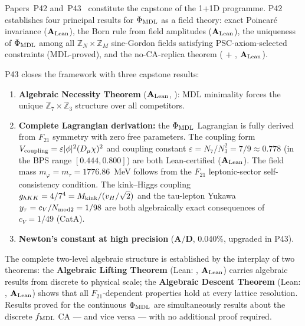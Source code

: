 Papers~P42 and~P43~\cite{SpivackPhiMDLField,SpivackCompleteness} constitute the
capstone of the 1+1D programme.  P42 establishes four principal results for
$\Phi_{\rm MDL}$ as a field theory: exact Poincar\'{e} invariance
($\mathbf{A}_{\rm Lean}$), the Born rule from field amplitudes
(\hspace{0pt}$\mathbf{A}_{\rm Lean}$), the uniqueness of $\Phi_{\rm MDL}$ among all
$\mathbb{Z}_N \times \mathbb{Z}_M$ sine-Gordon fields satisfying PSC-axiom-selected
constraints (MDL-proved), and the no-CA-replica theorem
( + ,
$\mathbf{A}_{\rm Lean}$).

P43 closes the framework with three capstone results:

\begin{enumerate}[leftmargin=2em,itemsep=0.2em]
  \item \textbf{Algebraic Necessity Theorem} ($\mathbf{A}_{\rm Lean}$,
    ): MDL minimality forces the unique
    $\mathbb{Z}_7 \times \mathbb{Z}_3$ structure over all competitors.
  \item \textbf{Complete Lagrangian derivation:} the $\Phi_{\rm MDL}$ Lagrangian
    is fully derived from $F_{21}$ symmetry with zero free parameters.  The
    coupling form $V_{\rm coupling} = \varepsilon|\phi|^2(D_\mu\chi)^2$ and coupling
    constant $\varepsilon = N_7/N_3^2 = 7/9 \approx 0.778$ (in the BPS range
    $[0.444, 0.800]$) are both Lean-certified ($\mathbf{A}_{\rm Lean}$).  The field
    mass $m_\varphi = m_\tau = 1776.86$~MeV follows from the $F_{21}$ leptonic-sector
    self-consistency condition.  The kink--Higgs coupling
    $g_{hKK} = 4/7^4 = M_{\rm kink}/(v_H/\sqrt{2})$ and the tau-lepton Yukawa
    $y_\tau = c_V/N_{\rm mod2} = 1/98$ are both algebraically exact consequences
    of $c_V = 1/49$ (CatA).
  \item \textbf{Newton's constant at high precision} ($\mathbf{A/D}$, 0.040\%,
    upgraded in P43).
\end{enumerate}

The complete two-level algebraic structure is established by the interplay of two
theorems: the \textbf{Algebraic Lifting Theorem} (Lean: ,
$\mathbf{A}_{\rm Lean}$) carries algebraic results from discrete to physical scale;
the \textbf{Algebraic Descent Theorem} (Lean: ,
$\mathbf{A}_{\rm Lean}$) shows that all $F_{21}$-dependent properties hold at every
lattice resolution.  Results proved for the continuous $\Phi_{\rm MDL}$ are
simultaneously results about the discrete $f_{\rm MDL}$ CA --- and vice versa ---
with no additional proof required.

